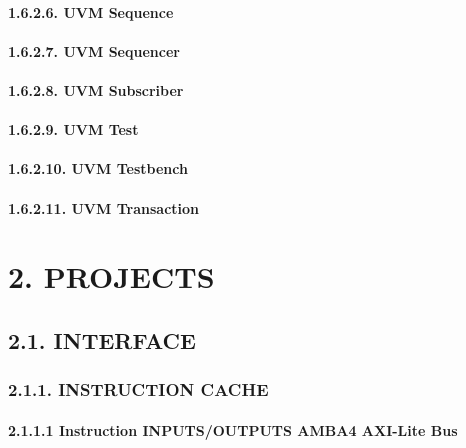 \documentclass[
]{article}
\begin{document}
\hypertarget{uvm-sequence-1}{%
\paragraph{1.6.2.6. UVM Sequence}\label{uvm-sequence-1}}

\hypertarget{uvm-sequencer-1}{%
\paragraph{1.6.2.7. UVM Sequencer}\label{uvm-sequencer-1}}

\hypertarget{uvm-subscriber-1}{%
\paragraph{1.6.2.8. UVM Subscriber}\label{uvm-subscriber-1}}

\hypertarget{uvm-test-1}{%
\paragraph{1.6.2.9. UVM Test}\label{uvm-test-1}}

\hypertarget{uvm-testbench-1}{%
\paragraph{1.6.2.10. UVM Testbench}\label{uvm-testbench-1}}

\hypertarget{uvm-transaction-1}{%
\paragraph{1.6.2.11. UVM Transaction}\label{uvm-transaction-1}}

\hypertarget{projects-1}{%
\section{2. PROJECTS}\label{projects-1}}

\hypertarget{interface-1}{%
\subsection{2.1. INTERFACE}\label{interface-1}}

\hypertarget{instruction-cache-1}{%
\subsubsection{2.1.1. INSTRUCTION CACHE}\label{instruction-cache-1}}

\hypertarget{instruction-inputsoutputs-amba4-axi-lite-bus-1}{%
\paragraph{2.1.1.1 Instruction INPUTS/OUTPUTS AMBA4 AXI-Lite
Bus}\label{instruction-inputsoutputs-amba4-axi-lite-bus-1}}
\end{document}
